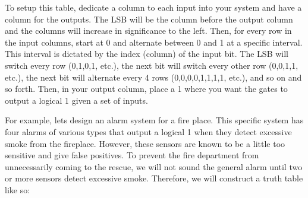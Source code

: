     To setup this table, dedicate a column to each input into your system and have a column for the outputs.
    The LSB will be the column before the output column and the columns will increase in significance to the left.
    Then, for every row in the input columns, start at 0 and alternate between 0 and 1 at a specific interval.
    This interval is dictated by the index (column) of the input bit.
    The LSB will switch every row (0,1,0,1, etc.), the next bit will switch every other row (0,0,1,1, etc.), the next bit will alternate every 4 rows (0,0,0,0,1,1,1,1, etc.), and so on and so forth.
    Then, in your output column, place a 1 where you want the gates to output a logical 1 given a set of inputs.

    For example, lets design an alarm system for a fire place.
    This specific system has four alarms of various types that output a logical 1 when they detect excessive smoke from the fireplace.
    However, these sensors are known to be a little too sensitive and give false positives.
    To prevent the fire department from unnecessarily coming to the rescue, we will not sound the general alarm until two or more sensors detect excessive smoke.
    Therefore, we will construct a truth table like so:

